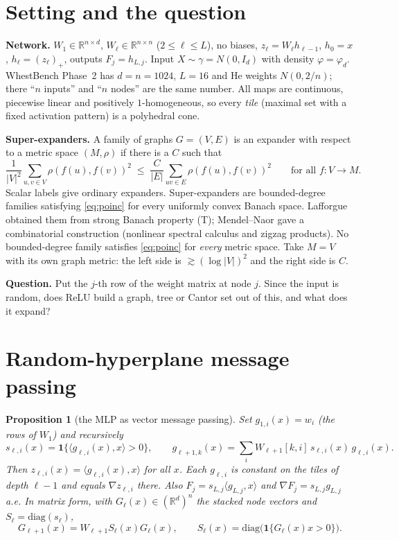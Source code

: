 \documentclass[11pt]{article}
\newtheorem{proposition}[theorem]{Proposition}
\theoremstyle{definition}
\theoremstyle{remark}
\newcommand{\R}{\mathbb R}
\begin{document}
\tableofcontents

\section{Setting and the question}

\textbf{Network.} $W_1\in\R^{n\times d}$, $W_\ell\in\R^{n\times n}$ ($2\le\ell\le L$), no biases, $z_\ell=W_\ell h_{\ell-1}$, $h_0=x$, $h_\ell=(z_\ell)_+$, outputs $F_j=h_{L,j}$. Input $X\sim\gamma=N(0,I_d)$ with density $\varphi=\varphi_d$. WhestBench Phase~2 has $d=n=1024$, $L=16$ and He weights $N(0,2/n)$; there ``$n$ inputs'' and ``$n$ nodes'' are the same number. All maps are continuous, piecewise linear and positively $1$-homogeneous, so every \emph{tile} (maximal set with a fixed activation pattern) is a polyhedral cone.

\textbf{Super-expanders.} A family of graphs $G=(V,E)$ is an expander with respect to a metric space $(M,\rho)$ if there is a $C$ such that
\begin{equation}\label{eq:poinc}
\frac1{|V|^2}\sum_{u,v\in V}\rho(f(u),f(v))^2\;\le\;\frac{C}{|E|}\sum_{uv\in E}\rho(f(u),f(v))^2\qquad\text{for all }f:V\to M.
\end{equation}
Scalar labels give ordinary expanders. Super-expanders are bounded-degree families satisfying \eqref{eq:poinc} for every uniformly convex Banach space. Lafforgue obtained them from strong Banach property (T); Mendel--Naor gave a combinatorial construction (nonlinear spectral calculus and zigzag products). No bounded-degree family satisfies \eqref{eq:poinc} for \emph{every} metric space. Take $M=V$ with its own graph metric: the left side is $\gtrsim(\log|V|)^2$ and the right side is $C$.

\textbf{Question.} Put the $j$-th row of the weight matrix at node $j$. Since the input is random, does ReLU build a graph, tree or Cantor set out of this, and what does it expand?

\section{Random-hyperplane message passing}

\begin{proposition}[the MLP as vector message passing]\label{prop:rhmp}
Set $g_{1,i}(x)=w_i$ (the rows of $W_1$) and recursively
\[
s_{\ell,i}(x)=\mathbf 1\{\langle g_{\ell,i}(x),x\rangle>0\},\qquad g_{\ell+1,k}(x)=\sum_i W_{\ell+1}[k,i]\,s_{\ell,i}(x)\,g_{\ell,i}(x).
\]
Then $z_{\ell,i}(x)=\langle g_{\ell,i}(x),x\rangle$ for all $x$. Each $g_{\ell,i}$ is constant on the tiles of depth $\ell-1$ and equals $\nabla z_{\ell,i}$ there. Also $F_j=s_{L,j}\langle g_{L,j},x\rangle$ and $\nabla F_j=s_{L,j}g_{L,j}$ a.e. In matrix form, with $G_\ell(x)\in(\R^d)^n$ the stacked node vectors and $S_\ell=\mathrm{diag}(s_\ell)$,
\[G_{\ell+1}(x)=W_{\ell+1}S_\ell(x)G_\ell(x),\qquad S_\ell(x)=\mathrm{diag}\big(\mathbf 1\{G_\ell(x)x>0\}\big).\]
\end{proposition}
\end{document}
